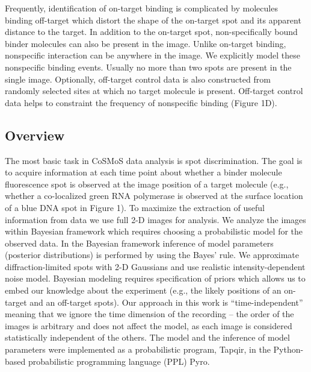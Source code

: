 Frequently, identification of on-target binding is complicated by molecules binding off-target which distort the shape of the on-target spot and its apparent distance to the target. In addition to the on-target spot, non-specifically bound binder molecules can also be present in the image. Unlike on-target binding, nonspecific interaction can be anywhere in the image. We explicitly model these nonspecific binding events. Usually no more than two spots are present in the single image. Optionally, off-target control data is also constructed from randomly selected sites at which no target molecule is present. Off-target control data helps to constraint the frequency of nonspecific binding (Figure 1D). %

\subsection{Overview}

The most basic task in CoSMoS data analysis is spot discrimination. The goal is to acquire information at each time point about whether a binder molecule fluorescence spot is observed at the image position of a target molecule (e.g., whether a co-localized green RNA polymerase is observed at the surface location of a blue DNA spot in Figure 1). To maximize the extraction of useful information from data we use full 2-D images for analysis. We analyze the images within Bayesian framework which requires choosing a probabilistic model for the observed data. In the Bayesian framework inference of model parameters (posterior distributions) is performed by using the Bayes' rule. We approximate diffraction-limited spots with 2-D Gaussians and use realistic intensity-dependent noise model. Bayesian modeling requires specification of priors which allows us to embed our knowledge about the experiment (e.g., the likely positions of an on-target and an off-target spots). Our approach in this work  is “time-independent” meaning that we ignore the time dimension of the recording -- the order of the images is arbitrary and does not affect the model, as each image is considered statistically independent of the others. The model and the inference of model parameters were implemented as a probabilistic program, Tapqir, in the Python-based probabilistic programming language (PPL) Pyro. %

